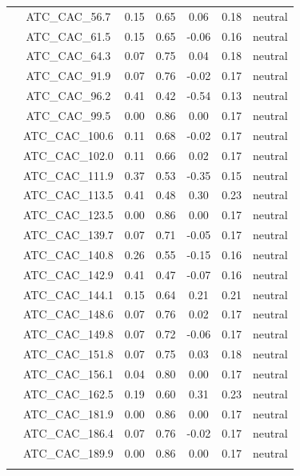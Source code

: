 \documentclass[11pt,]{article}
\begin{document}
\begin{longtable}[c]{@{}lcccccc@{}}
\\\addlinespace
& ATC\_CAC\_56.7 & 0.15 & 0.65 & 0.06 & 0.18 & neutral
\\\addlinespace
& ATC\_CAC\_61.5 & 0.15 & 0.65 & -0.06 & 0.16 & neutral
\\\addlinespace
& ATC\_CAC\_64.3 & 0.07 & 0.75 & 0.04 & 0.18 & neutral
\\\addlinespace
& ATC\_CAC\_91.9 & 0.07 & 0.76 & -0.02 & 0.17 & neutral
\\\addlinespace
& ATC\_CAC\_96.2 & 0.41 & 0.42 & -0.54 & 0.13 & neutral
\\\addlinespace
& ATC\_CAC\_99.5 & 0.00 & 0.86 & 0.00 & 0.17 & neutral
\\\addlinespace
& ATC\_CAC\_100.6 & 0.11 & 0.68 & -0.02 & 0.17 & neutral
\\\addlinespace
& ATC\_CAC\_102.0 & 0.11 & 0.66 & 0.02 & 0.17 & neutral
\\\addlinespace
& ATC\_CAC\_111.9 & 0.37 & 0.53 & -0.35 & 0.15 & neutral
\\\addlinespace
& ATC\_CAC\_113.5 & 0.41 & 0.48 & 0.30 & 0.23 & neutral
\\\addlinespace
& ATC\_CAC\_123.5 & 0.00 & 0.86 & 0.00 & 0.17 & neutral
\\\addlinespace
& ATC\_CAC\_139.7 & 0.07 & 0.71 & -0.05 & 0.17 & neutral
\\\addlinespace
& ATC\_CAC\_140.8 & 0.26 & 0.55 & -0.15 & 0.16 & neutral
\\\addlinespace
& ATC\_CAC\_142.9 & 0.41 & 0.47 & -0.07 & 0.16 & neutral
\\\addlinespace
& ATC\_CAC\_144.1 & 0.15 & 0.64 & 0.21 & 0.21 & neutral
\\\addlinespace
& ATC\_CAC\_148.6 & 0.07 & 0.76 & 0.02 & 0.17 & neutral
\\\addlinespace
& ATC\_CAC\_149.8 & 0.07 & 0.72 & -0.06 & 0.17 & neutral
\\\addlinespace
& ATC\_CAC\_151.8 & 0.07 & 0.75 & 0.03 & 0.18 & neutral
\\\addlinespace
& ATC\_CAC\_156.1 & 0.04 & 0.80 & 0.00 & 0.17 & neutral
\\\addlinespace
& ATC\_CAC\_162.5 & 0.19 & 0.60 & 0.31 & 0.23 & neutral
\\\addlinespace
& ATC\_CAC\_181.9 & 0.00 & 0.86 & 0.00 & 0.17 & neutral
\\\addlinespace
& ATC\_CAC\_186.4 & 0.07 & 0.76 & -0.02 & 0.17 & neutral
\\\addlinespace
& ATC\_CAC\_189.9 & 0.00 & 0.86 & 0.00 & 0.17 & neutral
\\\addlinespace

\end{longtable}
\end{document}
